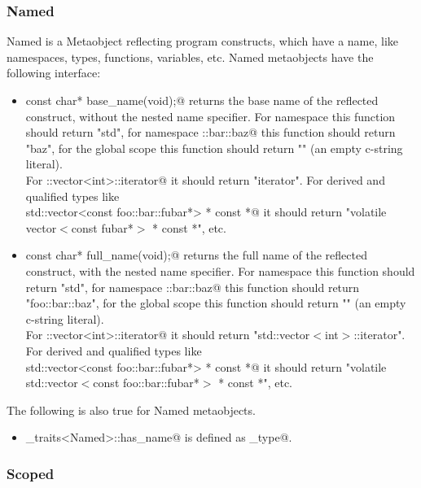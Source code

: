 \subsubsection{Named}

{\metaobject Named} is a {\metaobject Metaobject} reflecting program constructs,
which have a name, like namespaces, types, functions, variables, etc. {\metaobject Named}
metaobjects have the following interface:

\begin{itemize}

	\item{\verb@static const char* base_name(void);@} returns the base name
	of the reflected construct, without the nested name specifier. For namespace
	\verb@std@ this function should return "std", for namespace \verb@foo::bar::baz@
	this function should return "baz", for the global scope this function
	should return "" (an empty c-string literal).\\For \verb@std::vector<int>::iterator@
	it should return "iterator". For derived and qualified types like \\
	\verb@volatile std::vector<const foo::bar::fubar*> * const *@ it should return
	"volatile vector$<$const fubar*$>$ * const *", etc.

	\item{\verb@static const char* full_name(void);@} returns the full name
	of the reflected construct, with the nested name specifier. For namespace
	\verb@std@ this function should return "std", for namespace \verb@foo::bar::baz@
	this function should return "foo::bar::baz", for the global scope this function
	should return "" (an empty c-string literal).\\For \verb@std::vector<int>::iterator@
	it should return "std::vector$<$int$>$::iterator". For derived and qualified types like\\
	\verb@volatile std::vector<const foo::bar::fubar*> * const *@ it should return
	"volatile std::vector$<$const foo::bar::fubar*$>$ * const *", etc.
\end{itemize}

The following is also true for {\metaobject Named} metaobjects.

\begin{itemize}
	\item \verb@metaobject_traits<Named>::has_name@ is defined as \verb@true_type@.
\end{itemize}

\subsubsection{Scoped}

